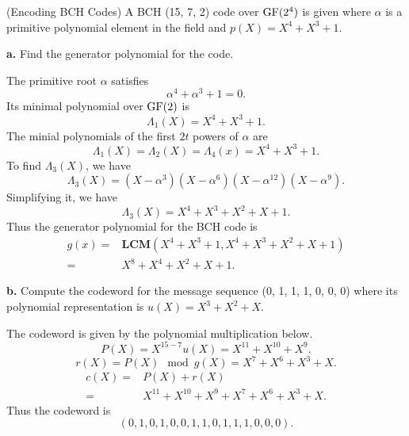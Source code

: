 \documentclass[12pt]{article}
\theoremstyle{plain}
\begin{document}
(Encoding BCH Codes) A BCH (15, 7, 2) code over $\textrm{GF}(2^4)$ is given where $\alpha$ is a primitive polynomial element in the field and $p(X) = X^4 + X^3 + 1$.

{\bf a.} Find the generator polynomial for the code.

\Sol The primitive root $\alpha$ satisfies
$$\alpha^4 + \alpha^3 + 1 =0.$$
Its minimal polynomial over $\textrm{GF}(2)$ is
$$\Lambda_1(X) = X^4 + X^3 + 1.$$
The minial polynomials of the first $2t$ powers of $\alpha$ are
$$\Lambda_1(X) = \Lambda_2(X) = \Lambda_4(x) = X^4 + X^3 + 1.$$
To find $\Lambda_3(X)$, we have
$$\Lambda_3(X) = (X-\alpha^3)(X-\alpha^6)(X-\alpha^{12})(X-\alpha^9).$$
Simplifying it, we have
$$\Lambda_3(X) = X^4 + X^3 + X^2 + X + 1.$$
Thus the generator polynomial for the BCH code is 
$$\begin{aligned}
g(x) =& \mathbf{LCM}(X^4 + X^3 + 1, X^4 + X^3 + X^2 + X + 1)\\
=& X^8 + X^4 + X^2 + X + 1.
\end{aligned}$$

{\bf b.} Compute the codeword for the message sequence (0, 1, 1, 1, 0, 0, 0)
where its polynomial representation is $u(X) = X^3 + X^2 + X$.

\Sol The codeword is given by the polynomial multiplication below.
$$P(X) = X^{15-7}u(X) = X^{11} + X^{10} + X^{9}.$$
$$r(X) = P(X) \mod g(X) = X^7 + X^6 + X^3 + X.$$
$$\begin{aligned}
c(X) =& P(X) + r(X)\\
=& X^{11} + X^{10} + X^9+ X^7 + X^6 + X^3 + X.
\end{aligned}$$
Thus the codeword is 
$$(0,1,0,1,0,0,1,1,0,1,1,1,0,0,0).$$
\end{document}
